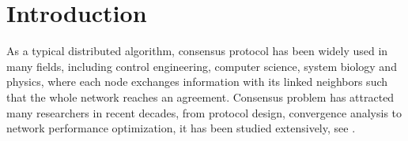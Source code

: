 \documentclass[10pt,journal,compsoc]{IEEEtran}
\begin{document}
\IEEEdisplaynontitleabstractindextext



%
\IEEEpeerreviewmaketitle



\section{Introduction}

As a typical distributed algorithm, consensus protocol has been widely used in many fields, including control engineering, computer science, system biology and physics, where each node exchanges information with its linked neighbors such that the whole network reaches an agreement. Consensus problem has attracted many researchers in recent decades, from protocol design, convergence analysis to network performance optimization, it has been studied extensively, see
 \cite{Olfatisaber2004Consensus,Olfati2007Consensus,Shi2012Optimal,yang2013fast,Yang2016Nodes}.
\end{document}
